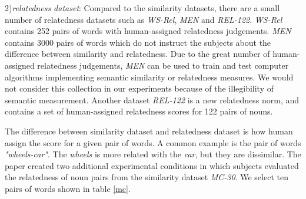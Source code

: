 2)\emph{relatedness dataset}:
Compared to the similarity datasets, there are a small number of relatedness datasets such as
\emph{WS-Rel}, \emph{MEN} and \emph{REL-122}. \emph{WS-Rel} contains 252 pairs of words with
human-assigned relatedness judgements. \emph{MEN} contains 3000 pairs of words which do not
instruct the subjects about the difference between similarity and relatedness. 
Due to the great number of human-assigned relatedness judgements, \emph{MEN} can
be used to train and test computer algorithms implementing semantic similarity or relatedness measures.
We would not consider this collection in our experiments because of the illegibility of semantic measurement.
Another dataset \emph{REL-122} is a new relatedness norm, and contains a set of human-assigned relatedness scores
for 122 pairs of nouns.

The difference between similarity dataset and relatedness dataset is how human assign the score for a
given pair of words. A common example is the pair of words \emph{"wheels-car"}. The \emph{wheels} is more related
with the \emph{car}, but they are dissimilar. The paper \cite{acl/SzumlanskiGS13} created two additional experimental 
conditions in which subjects evaluated the relatedness of noun pairs from the similarity dataset \emph{MC-30}. We select 
ten pairs of words shown in table \ref{mc}. 

